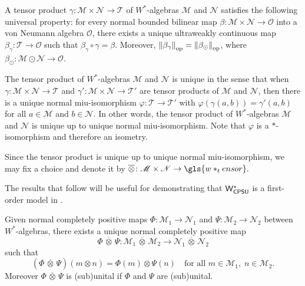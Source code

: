 \begin{theorem} \cite[Theorem 112 XI]{westerbaanCategoryNeumannAlgebras2019} \label{thm:beta_alg_eq_beta_gamma}
A tensor product $\gamma\colon \mathscr{M} \times \mathscr{N} \to \mathscr{T}$ of $W^*$-algebras $\mathscr{M}$ and $\mathscr{N}$ satisfies the following universal property: for every normal bounded bilinear map $\beta\colon  \mathscr{M} \times  \mathscr{N} \to \mathscr{O}$ into a von Neumann algebra $\mathscr{O}$, there exists a unique ultraweakly continuous map $\beta_\gamma\colon \mathscr{T} \to \mathscr{O}$ such that $\beta_\gamma \circ \gamma = \beta$. Moreover, $ \left\lVert \beta_\gamma \right\rVert_{\text{op}} = \left\lVert \beta_\odot \right\rVert_{\text{op}}$, where $
\beta_\odot\colon  \mathscr{M} \odot  \mathscr{N} \to \mathscr{O}.
$
\end{theorem}

\begin{proposition} \cite[Exercise 114 II]{westerbaanCategoryNeumannAlgebras2019} \label{prop:tenso_w_unique}
   The tensor product of $W^*$-algebras $\mathscr{M}$ and $\mathscr{N}$ is unique in the sense that when $\gamma \colon \mathscr{M} \times \mathscr{N} \to \mathscr{T}$ and $\gamma' \colon \mathscr{M} \times \mathscr{N} \to \mathscr{T'}$ are tensor products of $\mathscr{M}$ and $\mathscr{N}$, then there is a unique normal miu-isomorphism $\varphi \colon \mathscr{T} \to \mathscr{T'}$ with $\varphi(\gamma(a,b)) = \gamma'(a,b)$ for all $a \in \mathscr{M}$ and $b \in \mathscr{N}$. In other words, the tensor product of $W^*$-algebras $\mathscr{M}$ and $\mathscr{N}$ is unique up to unique normal miu-isomorphism. Note that $\varphi$ is a $*$-isomorphism and therefore an isometry.
\end{proposition}

Since the tensor product is unique up to unique normal miu-isomorphism, we may fix a choice and denote it by 
$\overline{\otimes} \colon \mathscr{M} \times \mathscr{N} \to \gls{w*_tensor}.$

The results that follow will be useful for demonstrating that $\mathsf{W^*_{CPSU}}$ is a first-order model in .


\begin{proposition} \cite[Proposition 115 II]{westerbaanCategoryNeumannAlgebras2019} \label{prop:mapa_tensor_w_u_ncpsu}
Given normal completely positive  maps \( \Phi: \mathscr{M}_1 \to \mathscr{N}_1 \) and \( \Psi: \mathscr{M}_2 \to \mathscr{N}_2 \) between $W^*$-algebras, there exists a unique normal completely positive map
\[
\Phi\,\overline{\otimes} \, \Psi: \mathscr{M}_1 \,\overline{\otimes}\, \mathscr{M}_2 \to \mathscr{N}_1 \,\overline{\otimes}\, \mathscr{N}_2
\]
such that
\[
(\Phi \, \overline{\otimes} \, \Psi)(m \otimes n) = \Phi(m) \otimes\Psi(n)
\quad \text{for all } m \in \mathscr{M}_1,\; n \in \mathscr{M}_2.
\]
Moreover \(\Phi\, \overline{\otimes}\, \Psi\) is (sub)unital if \(\Phi\) and \(\Psi\) are (sub)unital.
\end{proposition}


